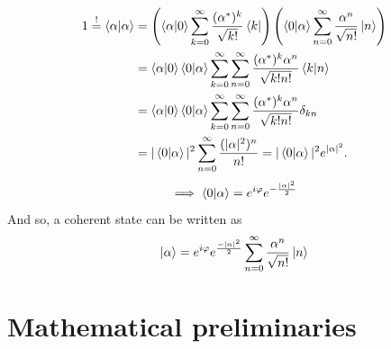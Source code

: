 \documentclass[12pt, a4paper,  nobibnotes]{article}
\begin{document}
\begin{align*}
    1\overset{!}{=} \braket{\alpha|\alpha} & = 
    \left(\braket{\alpha|0}\sum\limits_{k=0}^{\infty}\frac{(\alpha^*)^k}{\sqrt{k!}}\bra k\right)
    \left(\braket{0|\alpha}\sum\limits_{n=0}^{\infty}\frac{\alpha^n}{\sqrt{n!}}\ket n\right)\\
    &=\braket{\alpha|0}\braket{0|\alpha}\sum\limits_{k=0}^{\infty} \sum\limits_{n=0}^{\infty}
    \frac{(\alpha^*)^k\alpha^n}{\sqrt{k!n!}}\braket{k|n} \\
    &=\braket{\alpha|0}\braket{0|\alpha}\sum\limits_{k=0}^{\infty} \sum\limits_{n=0}^{\infty}
    \frac{(\alpha^*)^k\alpha^n}{\sqrt{k!n!}}\delta_{kn}\\
    &= |\braket{0|\alpha}|^2 \sum\limits_{n=0}^{\infty} \frac{(|\alpha|^2)^n}{n!} = |\braket{0|\alpha}|^2e^{|\alpha|^2}.
\end{align*}
\begin{equation*}
    \implies \braket{0|\alpha} = e^{i\varphi}e^{-\frac{|\alpha|^2}{2}}
\end{equation*}
And so, a coherent state can be written as 
\begin{equation*}
    \ket\alpha = e^{i\varphi}e^{\frac{-|\alpha|^2}{2}}\sum\limits_{n=0}^{\infty}\frac{\alpha^n}{\sqrt{n!}}\ket n
\end{equation*}
\section{Mathematical preliminaries}
\end{document}
